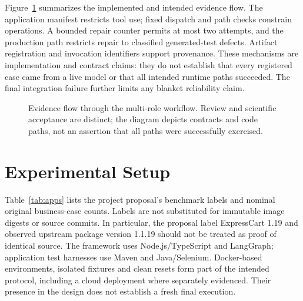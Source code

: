 \documentclass[pdflatex,sn-mathphys-num]{sn-jnl}
\begin{document}
Figure~\ref{fig:architecture} summarizes the implemented and intended evidence flow. The application manifest restricts tool use; fixed dispatch and path checks constrain operations. A bounded repair counter permits at most two attempts, and the production path restricts repair to classified generated-test defects. Artifact registration and invocation identifiers support provenance. These mechanisms are implementation and contract claims: they do not establish that every registered case came from a live model or that all intended runtime paths succeeded. The final integration failure further limits any blanket reliability claim.
\begin{figure}[htbp]\centering
\setlength{\fboxsep}{6pt}
\caption{Evidence flow through the multi-role workflow. Review and scientific acceptance are distinct; the diagram depicts contracts and code paths, not an assertion that all paths were successfully exercised.}\label{fig:architecture}
\end{figure}

\section{Experimental Setup}\label{sec:setup}
Table~\ref{tab:apps} lists the project proposal's benchmark labels and nominal original business-case counts. Labels are not substituted for immutable image digests or source commits. In particular, the proposal label ExpressCart 1.19 and observed upstream package version 1.1.19 should not be treated as proof of identical source. The framework uses Node.js/TypeScript and LangGraph; application test harnesses use Maven and Java/Selenium. Docker-based environments, isolated fixtures and clean resets form part of the intended protocol, including a cloud deployment where separately evidenced. Their presence in the design does not establish a fresh final execution.
\end{document}
